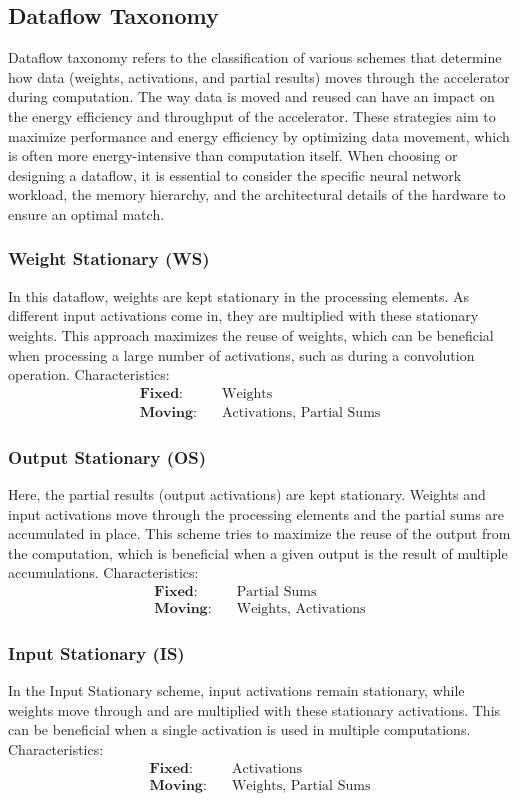 \subsection{Dataflow Taxonomy}
Dataflow taxonomy refers to the classification of various schemes that determine how data (weights, activations, and partial results) moves through the accelerator during computation. The way data is moved and reused can have an impact on the energy efficiency and throughput of the accelerator. These strategies aim to maximize performance and energy efficiency by optimizing data movement, which is often more energy-intensive than computation itself. When choosing or designing a dataflow, it is essential to consider the specific neural network workload, the memory hierarchy, and the architectural details of the hardware to ensure an optimal match.

\subsubsection{Weight Stationary (WS)}
In this dataflow, weights are kept stationary in the processing elements. As different input activations come in, they are multiplied with these stationary weights. This approach maximizes the reuse of weights, which can be beneficial when processing a large number of activations, such as during a convolution operation.
Characteristics:
\begin{align*}
\textbf{Fixed:} & \quad \text{Weights} \\
\textbf{Moving:} & \quad \text{Activations, Partial Sums}
\end{align*}

\subsubsection{Output Stationary (OS)}
Here, the partial results (output activations) are kept stationary. Weights and input activations move through the processing elements and the partial sums are accumulated in place. This scheme tries to maximize the reuse of the output from the computation, which is beneficial when a given output is the result of multiple accumulations. Characteristics:
\begin{align*}
\textbf{Fixed:} & \quad \text{Partial Sums} \\
\textbf{Moving:} & \quad \text{Weights, Activations}
\end{align*}

\subsubsection{Input Stationary (IS)}
In the Input Stationary scheme, input activations remain stationary, while weights move through and are multiplied with these stationary activations. This can be beneficial when a single activation is used in multiple computations. Characteristics:
\begin{align*}
\textbf{Fixed:} & \quad \text{Activations} \\
\textbf{Moving:} & \quad \text{Weights, Partial Sums}
\end{align*}

